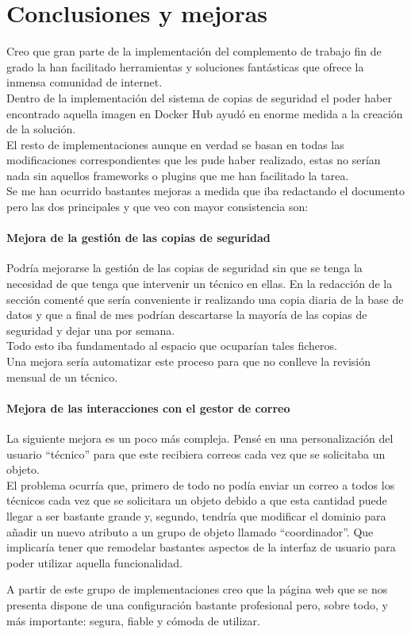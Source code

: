 \chapter{Conclusiones y mejoras}
Creo que gran parte de la implementación del complemento de trabajo fin de grado la han facilitado herramientas y soluciones fantásticas que ofrece la inmensa comunidad de internet.
\\Dentro de la implementación del sistema de copias de seguridad el poder haber encontrado aquella imagen en Docker Hub ayudó en enorme medida a la creación de la solución.
\\El resto de implementaciones aunque en verdad se basan en todas las modificaciones correspondientes que les pude haber realizado, estas no serían nada sin aquellos frameworks o plugins que me han facilitado la tarea.
\\Se me han ocurrido bastantes mejoras a medida que iba redactando el documento pero las dos principales y que veo con mayor consistencia son:

\subsubsection{Mejora de la gestión de las copias de seguridad}
Podría mejorarse la gestión de las copias de seguridad sin que se tenga la necesidad de que tenga que intervenir un técnico en ellas. En la redacción de la sección comenté que sería conveniente ir realizando una copia diaria de la base de datos y que a final de mes podrían descartarse la mayoría de las copias de seguridad y dejar una por semana.
\\Todo esto iba fundamentado al espacio que ocuparían tales ficheros.
\\Una mejora sería automatizar este proceso para que no conlleve la revisión mensual de un técnico.

\subsubsection{Mejora de las interacciones con el gestor de correo}
La siguiente mejora es un poco más compleja. Pensé en una personalización del usuario ``técnico'' para que este recibiera correos cada vez que se solicitaba un objeto.
\\El problema ocurría que, primero de todo no podía enviar un correo a todos los técnicos cada vez que se solicitara un objeto debido a que esta cantidad puede llegar a ser bastante grande y, segundo, tendría que modificar el dominio para añadir un nuevo atributo a un grupo de objeto llamado ``coordinador''. Que implicaría tener que remodelar bastantes aspectos de la interfaz de usuario para poder utilizar aquella funcionalidad.

\vspace{\baselineskip}
A partir de este grupo de implementaciones creo que la página web que se nos presenta dispone de una configuración bastante profesional pero, sobre todo, y más importante: segura, fiable y cómoda de utilizar.